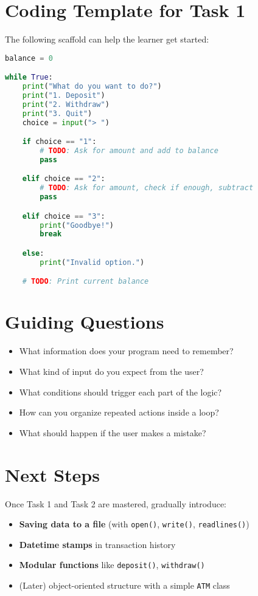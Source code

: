 \documentclass[a4paper,12pt]{article}
\begin{document}
\bigskip

\section*{Coding Template for Task 1}
The following scaffold can help the learner get started:

\begin{lstlisting}[language=Python, caption={Basic ATM Structure}]
balance = 0

while True:
    print("What do you want to do?")
    print("1. Deposit")
    print("2. Withdraw")
    print("3. Quit")
    choice = input("> ")

    if choice == "1":
        # TODO: Ask for amount and add to balance
        pass

    elif choice == "2":
        # TODO: Ask for amount, check if enough, subtract
        pass

    elif choice == "3":
        print("Goodbye!")
        break

    else:
        print("Invalid option.")

    # TODO: Print current balance
\end{lstlisting}

\bigskip

\section*{Guiding Questions}
\begin{tcolorbox}[colback=green!10, colframe=green!40, title=Encourage Thinking]
\begin{itemize}
    \item What information does your program need to remember?
    \item What kind of input do you expect from the user?
    \item What conditions should trigger each part of the logic?
    \item How can you organize repeated actions inside a loop?
    \item What should happen if the user makes a mistake?
\end{itemize}
\end{tcolorbox}

\bigskip

\section*{Next Steps}
Once Task 1 and Task 2 are mastered, gradually introduce:
\begin{itemize}
    \item \textbf{Saving data to a file} (with \texttt{open()}, \texttt{write()}, \texttt{readlines()})
    \item \textbf{Datetime stamps} in transaction history
    \item \textbf{Modular functions} like \texttt{deposit()}, \texttt{withdraw()}
    \item (Later) object-oriented structure with a simple \texttt{ATM} class
\end{itemize}
\end{document}
